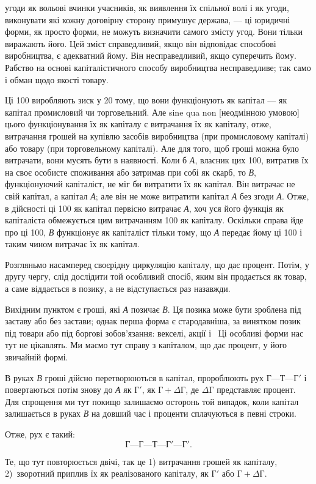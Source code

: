 \parcont{}  %
угоди як вольові вчинки учасників, як виявлення їх спільної
волі і як угоди, виконувати які кожну договірну сторону примушує
держава, — ці юридичні форми, як просто форми, не можуть
визначити самого змісту угод. Вони тільки виражають його.
Цей зміст справедливий, якщо він відповідає способові виробництва,
є адекватний йому. Він несправедливий, якщо суперечить
йому. Рабство на основі капіталістичного способу виробництва
несправедливе; так само і обман щодо якості товару.

Ці 100 виробляють зиск у 20
тому, що вони функціонують як капітал — як капітал
промисловий чи торговельний. Але sine qua non [неодмінною
умовою] цього функціонування їх як капіталу є витрачання їх
як капіталу, отже, витрачання грошей на купівлю засобів виробництва
(при промисловому капіталі) або товару (при торговельному
капіталі). Але для того, щоб гроші можна було витрачати,
вони мусять бути в наявності. Коли б \emph{А}, власник цих
100, витратив їх на своє особисте споживання
або затримав при собі як скарб, то \emph{В}, функціонуючий капіталіст,
не міг би витратити їх як капітал. Він витрачає не свій
капітал, а капітал \emph{А}; але він не може витратити капітал \emph{А} без
згоди \emph{А}. Отже, в дійсності ці 100 як капітал
первісно витрачає \emph{А}, хоч уся його функція як капіталіста обмежується
цим витрачанням 100 як капіталу.
Оскільки справа йде про ці 100, \emph{В} функціонує
як капіталіст тільки тому, що \emph{А} передає йому ці 100 і таким чином витрачає їх як капітал.

Розгляньмо насамперед своєрідну циркуляцію капіталу, що
дає процент. Потім, у другу чергу, слід дослідити той особливий
спосіб, яким він продається як товар, а саме віддається
в позику, а не відступається раз назавжди.

Вихідним пунктом є гроші, які \emph{А} позичає \emph{В}. Ця позика може
бути зроблена під заставу або без застави; однак перша форма є
стародавніша, за винятком позик під товари або під боргові
зобов’язання: векселі, акції і~ Ці особливі форми нас тут
не цікавлять. Ми маємо тут справу з капіталом, що дає процент,
у його звичайній формі.

В руках \emph{В} гроші дійсно перетворюються в капітал, пророблюють
рух $Г — Т — Г'$ і повертаються потім знову до \emph{А} як $Г'$,
як $Г + ΔГ$, де $ΔГ$ представляє процент. Для спрощення ми тут
покищо залишаємо осторонь той випадок, коли капітал залишається
в руках \emph{В} на довший час і проценти сплачуються
в певні строки.

Отже, рух є такий: \[
Г — Г — Т — Г' — Г'\text{.}
\]

\noindent{}Те, що тут повторюється двічі, так це 1) витрачання грошей
як капіталу, 2)~зворотний приплив їх як реалізованого
капіталу, як $Г'$ або $Г + ΔГ$.
